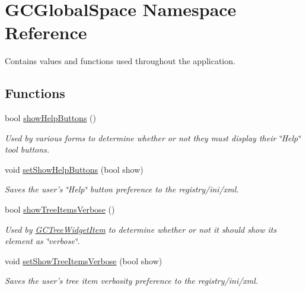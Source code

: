 \hypertarget{namespace_g_c_global_space}{\section{\-G\-C\-Global\-Space \-Namespace \-Reference}
\label{namespace_g_c_global_space}
}


\-Contains values and functions used throughout the application.  


\subsection*{\-Functions}
\begin{DoxyCompactItemize}
\item 
bool \hyperlink{namespace_g_c_global_space_a981753e55f0f77f981f67ccb1ad4ecf1}{show\-Help\-Buttons} ()
\begin{DoxyCompactList}\small\item\em \-Used by various forms to determine whether or not they must display their \char`\"{}\-Help\char`\"{} tool buttons. \end{DoxyCompactList}\item 
void \hyperlink{namespace_g_c_global_space_a6395acc08160e411395f96a88793eacc}{set\-Show\-Help\-Buttons} (bool show)
\begin{DoxyCompactList}\small\item\em \-Saves the user's \char`\"{}\-Help\char`\"{} button preference to the registry/ini/xml. \end{DoxyCompactList}\item 
bool \hyperlink{namespace_g_c_global_space_ad9a35f311bda4dd28f5cf155c5efc818}{show\-Tree\-Items\-Verbose} ()
\begin{DoxyCompactList}\small\item\em \-Used by \hyperlink{class_g_c_tree_widget_item}{\-G\-C\-Tree\-Widget\-Item} to determine whether or not it should show its element as \char`\"{}verbose\char`\"{}. \end{DoxyCompactList}\item 
void \hyperlink{namespace_g_c_global_space_a58bc4fea7a061440f9ef2dd0aca8aba5}{set\-Show\-Tree\-Items\-Verbose} (bool show)
\begin{DoxyCompactList}\small\item\em \-Saves the user's tree item verbosity preference to the registry/ini/xml. \end{DoxyCompactList}\end{DoxyCompactItemize}

